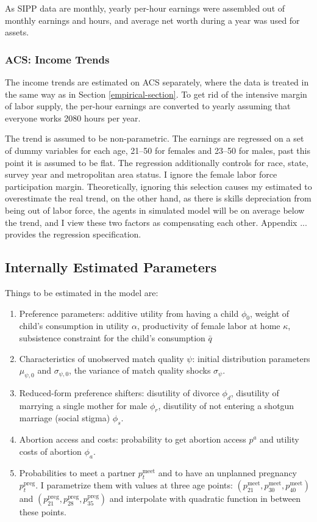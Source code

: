 \documentclass[12pt,letter]{article}
\begin{document}
As SIPP data are monthly, yearly per-hour earnings were assembled out of monthly earnings and hours, and average net worth during a year was used for assets.

\subsubsection{ACS: Income Trends}
The income trends are estimated on ACS separately, where the data is treated in the same way as in Section \ref{empirical-section}. To get rid of the intensive margin of labor supply, the per-hour earnings are converted to yearly assuming that everyone works 2080 hours per year.

The trend is assumed to be non-parametric. The earnings are regressed on a set of dummy variables for each age, 21--50 for females and 23--50 for males, past this point it is assumed to be flat. The regression additionally controls for race, state, survey year and metropolitan area status. I ignore the female labor force participation margin. Theoretically, ignoring this selection causes my estimated to overestimate the real trend, on the other hand, as there is skills depreciation from being out of labor force, the agents in simulated model will be on average below the trend, and I view these two factors as compensating each other. Appendix ... provides the regression specification.

\subsection{Internally Estimated Parameters}
Things to be estimated in the model are:
\begin{enumerate}
\item Preference parameters: additive utility from having a child $\phi_0$, weight of child's consumption in utility $\alpha$, productivity of female labor at home $\kappa$, subsistence constraint for the child's consumption $\bar{q}$
\item Characteristics of unobserved match quality $\psi$: initial distribution parameters $\mu_{\psi,0}$ and $\sigma_{\psi,0}$, the variance of match quality shocks $\sigma_{\psi}$.
\item Reduced-form preference shifters: disutility of divorce $\phi_d$, disutility of marrying a single mother for male $\phi_r$, disutility of not entering a shotgun marriage (social stigma) $\phi_s$.
\item Abortion access and costs: probability to get abortion access $p^{a}$ and utility costs of abortion $\phi_a$.
\item Probabilities to meet a partner $p^{\text{meet}}_t$ and to have an unplanned pregnancy $p^{\text{preg}}_t$.  I parametrize them with values at three age points: $(p^{\text{meet}}_{21},p^{\text{meet}}_{30},p^{\text{meet}}_{40})$ and $(p^{\text{preg}}_{21},p^{\text{preg}}_{28},p^{\text{preg}}_{35})$ and interpolate with quadratic function in between these points.
\end{enumerate}
\end{document}
